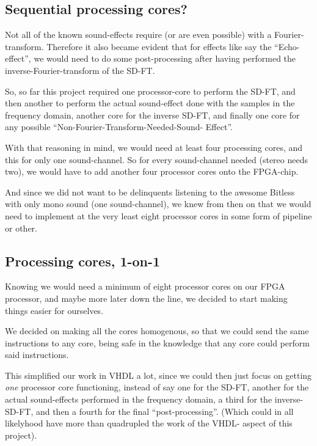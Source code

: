 \subsection{Sequential processing cores?}

Not all of the known sound-effects require (or are even possible) with a
Fourier-transform. Therefore it also became evident that for effects like say
the ``Echo-effect'', we would need to do some post-processing after having
performed the inverse-Fourier-transform of the 
SD-FT.

So, so far this project required one processor-core to perform the SD-FT, and
then another to perform the actual sound-effect done with the samples in the
frequency domain, another core for the inverse SD-FT, and finally one core for
any possible ``Non-Fourier-Transform-Needed-Sound-
Effect''.

With that reasoning in mind, we would need at least four processing cores, and
this for only one sound-channel. So for every sound-channel needed (stereo needs
two), we would have to add another four processor cores onto the FPGA-chip.

And since we did not want to be delinquents listening to the awesome 
Bitless with only mono sound (one sound-channel), we knew from then on that we
would need to implement at the very least eight processor cores in some form of
pipeline or other.

\FloatBarrier
\subsection{Processing cores, 1-on-1}

Knowing we would need a minimum of eight processor cores on our FPGA processor,
and maybe more later down the line, we decided to start making things easier
for ourselves.

We decided on making all the cores homogenous, so that we could send the same
instructions to any core, being safe in the knowledge that any core could
perform said instructions.

This simplified our work in VHDL a lot, since we could then just focus on
getting \emph{one} processor core functioning, instead of say one for the SD-FT,
another for the actual sound-effects performed in the frequency domain, a third
for the inverse-SD-FT, and then a fourth for the final ``post-processing''.
(Which could in all likelyhood have more than quadrupled the work of the VHDL-
aspect of this project).

